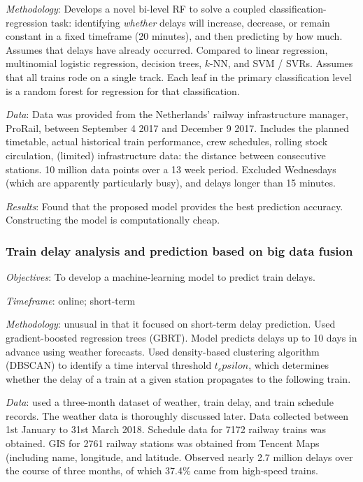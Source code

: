 \documentclass{article}
\begin{document}
\textit{Methodology}: Develops a novel bi-level RF to solve a coupled classification-regression task: identifying \textit{whether} delays will increase, decrease, or remain constant in a fixed timeframe (20 minutes), and then predicting by how much. Assumes that delays have already occurred. Compared to linear regression, multinomial logistic regression, decision trees, $k$-NN, and SVM / SVRs. Assumes that all trains rode on a single track. Each leaf in the primary classification level is a random forest for regression for that classification.

\smallskip

\textit{Data}: Data was provided from the Netherlands' railway infrastructure manager, ProRail, between September 4 2017 and December 9 2017. Includes the planned timetable, actual historical train performance, crew schedules, rolling stock circulation, (limited) infrastructure data: the distance between consecutive stations. 10 million data points over a 13 week period. Excluded Wednesdays (which are apparently particularly busy), and delays longer than 15 minutes.

\smallskip

\textit{Results}: Found that the proposed model provides the best prediction accuracy. Constructing the model is computationally cheap.

\subsubsection{Train delay analysis and prediction based on big data fusion \cite{wang_et_al_2019}}

\textit{Objectives}: To develop a machine-learning model to predict train delays.

\smallskip

\textit{Timeframe}: online; short-term

\smallskip

\textit{Methodology}: unusual in that it focused on short-term delay prediction. Used gradient-boosted regression trees (GBRT). Model predicts delays up to 10 days in advance using weather forecasts. Used density-based clustering algorithm (DBSCAN) to identify a time interval threshold $t_epsilon$, which determines whether the delay of a train at a given station propagates to the following train.  

\smallskip

\textit{Data}: used a three-month dataset of weather, train delay, and train schedule records. The weather data is thoroughly discussed later. Data collected between 1st January to 31st March 2018.
Schedule data for 7172 railway trains was obtained. GIS for 2761 railway stations was obtained from Tencent Maps (including name, longitude, and latitude. Observed nearly 2.7 million delays over the course of three months, of which 37.4\% came from high-speed trains. 
\end{document}
